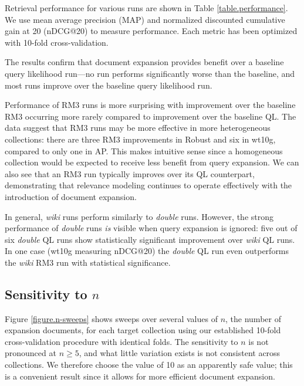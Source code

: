 \documentclass{sig-alternate}
\begin{document}
Retrieval performance for various runs are shown in Table \ref{table.performance}. We use mean average precision (MAP) and normalized discounted cumulative gain at 20 (nDCG@20) to measure performance. Each metric has been optimized with 10-fold cross-validation.

The results confirm that document expansion provides benefit over a baseline query likelihood run---no run performs significantly worse than the baseline, and most runs improve over the baseline query likelihood run. %

Performance of RM3 runs is more surprising with improvement over the baseline RM3 occurring more rarely compared to improvement over the baseline QL. The data suggest that RM3 runs may be more effective in more heterogeneous collections: there are three RM3 improvements in Robust and six in wt10g, compared to only one in AP. This makes intuitive sense since a homogeneous collection would be expected to receive less benefit from query expansion. We can also see that an RM3 run typically improves over its QL counterpart, demonstrating that relevance modeling continues to operate effectively with the introduction of document expansion.

In general, \textit{wiki} runs perform similarly to \textit{double} runs. However, the strong performance of \textit{double} runs \textit{is} visible when query expansion is ignored: five out of six \textit{double} QL runs show statistically significant improvement over \textit{wiki} QL runs. In one case (wt10g measuring nDCG@20) the \textit{double} QL run even outperforms the \textit{wiki} RM3 run with statistical significance.

\subsection{Sensitivity to \boldmath$n$}\label{section.n-sensitivity}

Figure \ref{figure.n-sweeps} shows sweeps over several values of $n$, the number of expansion documents, for each target collection using our established 10-fold cross-validation procedure with identical folds. The sensitivity to $n$ is not pronounced at $n \geq 5$, and what little variation exists is not consistent across collections. We therefore choose the value of 10 as an apparently safe value; this is a convenient result since it allows for more efficient document expansion.
\end{document}
